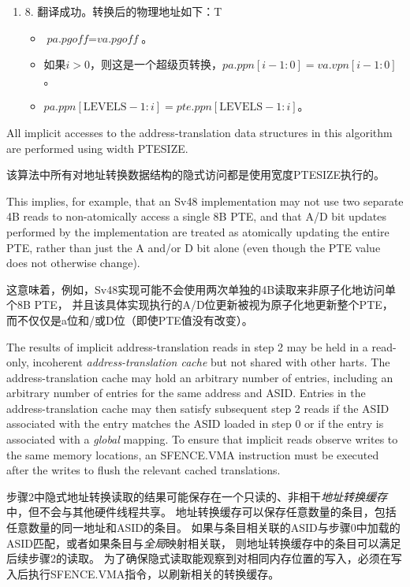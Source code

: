 \begin{enumerate}
\item 8. 翻译成功。转换后的物理地址如下：T
\begin{itemize}
\item $\textit{pa.pgoff} = \textit{va.pgoff}$。
\item 如果$i>0$，则这是一个超级页转换，$pa.ppn[i-1:0]=va.vpn[i-1:0]$。
\item $pa.ppn[\textrm{LEVELS} - 1:i] = pte.ppn[\textrm{LEVELS} - 1:i]$。
\end{itemize}

\end{enumerate}

All implicit accesses to the address-translation data structures in this
algorithm are performed using width PTESIZE.

该算法中所有对地址转换数据结构的隐式访问都是使用宽度PTESIZE执行的。

\begin{commentary}
This implies, for example, that an Sv48 implementation may not use two separate
4B reads to non-atomically access a single 8B PTE, and that A/D bit updates
performed by the implementation are treated as atomically updating the entire
PTE, rather than just the A and/or D bit alone (even though the PTE value does
not otherwise change).

这意味着，例如，Sv48实现可能不会使用两次单独的4B读取来非原子化地访问单个8B PTE，
并且该具体实现执行的A/D位更新被视为原子化地更新整个PTE，而不仅仅是a位和/或D位（即使PTE值没有改变）。
\end{commentary}
The results of implicit address-translation reads in step 2 may be held in a
read-only, incoherent {\em address-translation cache} but not shared with other
harts.  The address-translation cache may hold an arbitrary number of entries,
including an arbitrary number of entries for the same address and ASID.
Entries in the address-translation cache may then satisfy subsequent step 2
reads if the ASID associated with the entry matches the ASID loaded in step 0
or if the entry is associated with a {\em global} mapping.  To ensure that
implicit reads observe writes to the same memory locations, an SFENCE.VMA
instruction must be executed after the writes to flush the relevant cached
translations.

步骤2中隐式地址转换读取的结果可能保存在一个只读的、非相干{\em 地址转换缓存}中，但不会与其他硬件线程共享。
地址转换缓存可以保存任意数量的条目，包括任意数量的同一地址和ASID的条目。
如果与条目相关联的ASID与步骤0中加载的ASID匹配，或者如果条目与{\em 全局}映射相关联，
则地址转换缓存中的条目可以满足后续步骤2的读取。
为了确保隐式读取能观察到对相同内存位置的写入，必须在写入后执行SFENCE.VMA指令，以刷新相关的转换缓存。


